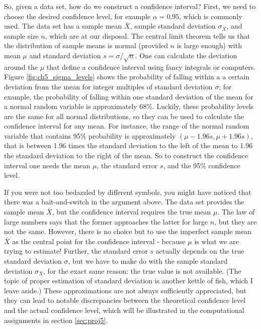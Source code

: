\documentclass[
]{book}
\theoremstyle{definition}
\theoremstyle{definition}
\theoremstyle{definition}
\theoremstyle{remark}
\begin{document}
So, given a data set, how do we construct a confidence interval? First, we need to choose the desired confidence level, for example \(\alpha=0.95\), which is commonly used. The data set has a sample mean \(\bar X\), sample standard deviation \(\sigma_X\), and sample size \(n\), which are at our disposal. The central limit theorem tells us that the distribution of sample means is normal (provided \(n\) is large enough) with mean \(\mu\) and standard deviation \(s=\sigma/\sqrt n\). One can calculate the deviation around the \(\mu\) that define a confidence interval using fancy integrals or computers. Figure \ref{fig:ch5_sigma_levels} shows the probability of falling within a a certain deviation from the mean for integer multiples of standard deviation \(\sigma\); for example, the probability of falling within one standard deviation of the mean for a normal random variable is approximately 68\%. Luckily, these probability levels are the same for all normal distributions, so they can be used to calculate the confidence interval for any mean. For instance, the range of the normal random variable that contains 95\% probability is approximately \((\mu - 1.96 s, \mu + 1.96 s)\), that is between 1.96 times the standard deviation to the left of the mean to 1.96 the standard deviation to the right of the mean. So to construct the confidence interval one needs the mean \(\mu\), the standard error \(s\), and the 95\% confidence level.

If you were not too bedazzled by different symbols, you might have noticed that there was a bait-and-switch in the argument above. The data set provides the sample mean \(\bar X\), but the confidence interval requires the true mean \(\mu\). The law of large numbers says that the former approaches the latter for large \(n\), but they are not the same. However, there is no choice but to use the imperfect sample mean \(\bar X\) as the central point for the confidence interval - because \(\mu\) is what we are trying to estimate! Further, the standard error \(s\) actually depends on the true standard deviation \(\sigma\), but we have to make do with the sample standard deviation \(\sigma_X\), for the exact same reason: the true value is not available. (The topic of proper estimation of standard deviation is another kettle of fish, which I leave aside.) These approximations are not always sufficiently appreciated, but they can lead to notable discrepancies between the theoretical confidence level and the actual confidence level, which will be illustrated in the computational assignments in section \ref{sec:proj5}.
\end{document}
